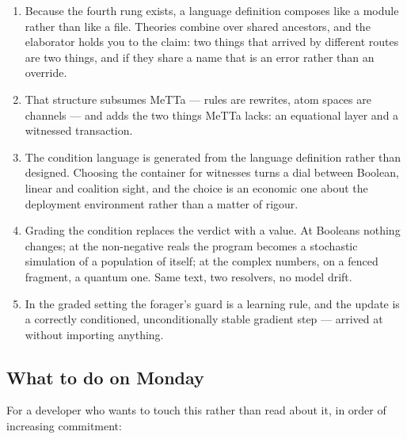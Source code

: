 \begin{enumerate}[leftmargin=1.8em,itemsep=3pt]
\item Because the fourth rung exists, a language definition composes like a
  module rather than like a file. Theories combine over shared ancestors, and
  the elaborator holds you to the claim: two things that arrived by different
  routes are two things, and if they share a name that is an error rather than
  an override.
\item That structure subsumes MeTTa --- rules are rewrites, atom spaces are
  channels --- and adds the two things MeTTa lacks: an equational layer and a
  witnessed transaction.
\item The condition language is generated from the language definition rather
  than designed. Choosing the container for witnesses turns a dial between
  Boolean, linear and coalition sight, and the choice is an economic one about
  the deployment environment rather than a matter of rigour.
\item Grading the condition replaces the verdict with a value. At Booleans
  nothing changes; at the non-negative reals the program becomes a stochastic
  simulation of a population of itself; at the complex numbers, on a fenced
  fragment, a quantum one. Same text, two resolvers, no model drift.
\item In the graded setting the forager's guard is a learning rule, and the
  update is a correctly conditioned, unconditionally stable gradient step ---
  arrived at without importing anything.
\end{enumerate}

\subsection{What to do on Monday}

For a developer who wants to touch this rather than read about it, in order of
increasing commitment:

